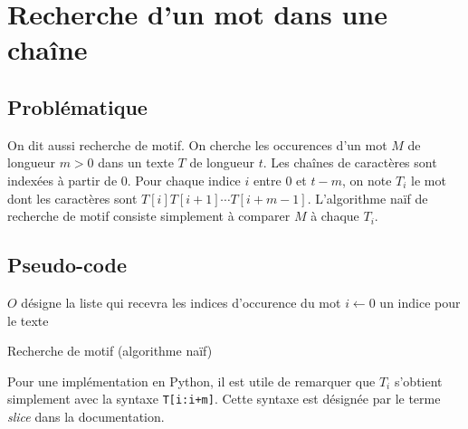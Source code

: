 \section{Recherche d'un mot dans une chaîne}
\subsection{Problématique}
On dit aussi recherche de motif. On cherche les occurences d'un mot $M$ de longueur $m>0$ dans un texte $T$ de longueur $t$. Les chaînes de caractères sont indexées à partir de 0. Pour chaque indice $i$ entre $0$ et $t-m$, on note $T_i$ le mot dont les caractères sont $T[i] T[i+1] \cdots T[i+m-1]$. L'algorithme naïf de recherche de motif consiste simplement à comparer $M$ à chaque $T_i$. 
\subsection{Pseudo-code}
\begin{algorithm}
  $O$ désigne la liste qui recevra les indices d'occurence du mot\;
  $i\leftarrow 0$ un indice pour le texte \;
  \caption{Recherche de motif (algorithme naïf)}
  \label{algousu_4}
\end{algorithm}
Pour une implémentation en Python, il est utile de remarquer que $T_i$ s'obtient simplement avec la syntaxe \verb|T[i:i+m]|. Cette syntaxe est désignée par le terme \emph{slice} dans la documentation.

